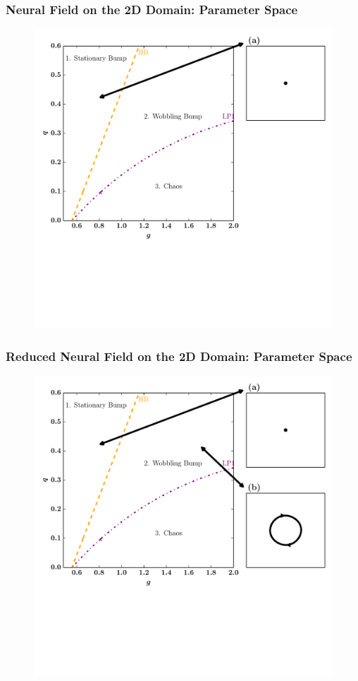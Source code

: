 \documentclass{beamer}
\begin{document}
\begin{frame}
\frametitle{Neural Field on the 2D Domain: Parameter Space}
\begin{figure}
 \includegraphics[width=.6\textwidth]{twod_phase_2par1.pdf}
\end{figure}
\end{frame}



\begin{frame}
\frametitle{Reduced Neural Field on the 2D Domain: Parameter Space}
\begin{figure}
 \includegraphics[width=.6\textwidth]{twod_phase_2par2.pdf}
\end{figure}
\end{frame}
\end{document}
